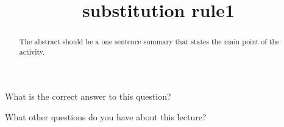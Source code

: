 \documentclass{ximera}
\title{substitution rule1}
\begin{document}
\begin{abstract}
  The abstract should be a one sentence summary that states the main point of the activity.
\end{abstract}

\maketitle

\begin{question}
  What is the correct answer to this question?

  \begin{solution}
    \begin{multiple-choice}
    \end{multiple-choice}  
  \end{solution}
\end{question}

What other questions do you have about this lecture?
\begin{free-response}
\end{free-response}
\end{document}
